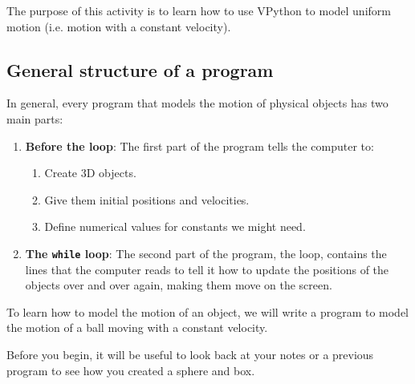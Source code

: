 
\apparatus
{}

\longgoal

The purpose of this activity is to learn how to use VPython to model uniform motion (i.e. motion with a constant velocity).

\introduction

\subsection*{General structure of a program}

In general, every program that models the motion of physical objects has two main parts:

\begin{enumerate}
	\item {\bf Before the loop}:  The first part of the program tells the computer to:
	\begin{enumerate}
		\item Create 3D objects.
		\item Give them initial positions and velocities.
		\item Define numerical values for constants we might need.
	\end{enumerate}
	\item {\bf The \texttt{while} loop}:  The second part of the program, the loop, contains the lines that the computer reads to tell it how to update the positions of the objects over and over again, making them move on the screen. \end{enumerate}

To learn how to model the motion of an object, we will write a program to model the motion of a ball moving with a constant velocity.

\procedure

Before you begin, it will be useful to look back at your notes or a previous program to see how you created a sphere and box.

